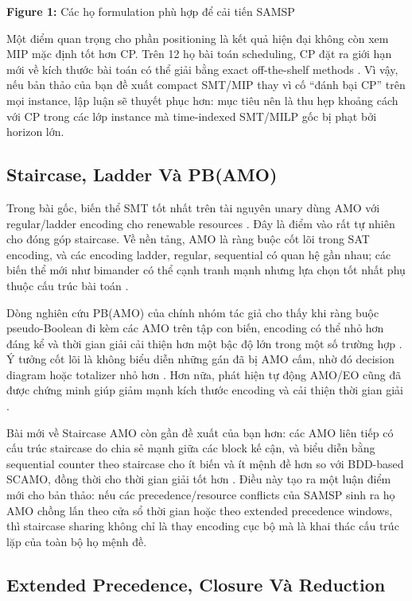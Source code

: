 \textbf{Figure 1:} Các họ formulation phù hợp để cải tiến SAMSP


Một điểm quan trọng cho phần positioning là kết quả hiện đại không còn xem MIP mặc định tốt hơn CP. Trên 12 họ bài toán scheduling, CP đặt ra giới hạn mới về kích thước bài toán có thể giải bằng exact off-the-shelf methods  \cite{Naderi2023Mixed-Integer}. Vì vậy, nếu bản thảo của bạn đề xuất compact SMT/MIP thay vì cố “đánh bại CP” trên mọi instance, lập luận sẽ thuyết phục hơn: mục tiêu nên là thu hẹp khoảng cách với CP trong các lớp instance mà time-indexed SMT/MILP gốc bị phạt bởi horizon lớn.


\subsection*{Staircase, Ladder Và PB(AMO)}


Trong bài gốc, biến thể SMT tốt nhất trên tài nguyên unary dùng AMO với regular/ladder encoding cho renewable resources  \cite{Bofill2022The}. Đây là điểm vào rất tự nhiên cho đóng góp staircase. Về nền tảng, AMO là ràng buộc cốt lõi trong SAT encoding, và các encoding ladder, regular, sequential có quan hệ gần nhau; các biến thể mới như bimander có thể cạnh tranh mạnh nhưng lựa chọn tốt nhất phụ thuộc cấu trúc bài toán  \cite{Hölldobler2013An}.


Dòng nghiên cứu PB(AMO) của chính nhóm tác giả cho thấy khi ràng buộc pseudo-Boolean đi kèm các AMO trên tập con biến, encoding có thể nhỏ hơn đáng kể và thời gian giải cải thiện hơn một bậc độ lớn trong một số trường hợp  \cite{Bofill2021SAT}. Ý tưởng cốt lõi là không biểu diễn những gán đã bị AMO cấm, nhờ đó decision diagram hoặc totalizer nhỏ hơn  \cite{Bofill2020An}. Hơn nữa, phát hiện tự động AMO/EO cũng đã được chứng minh giúp giảm mạnh kích thước encoding và cải thiện thời gian giải  \cite{Ansótegui2019Automatic}.


Bài mới về Staircase AMO còn gần đề xuất của bạn hơn: các AMO liên tiếp có cấu trúc staircase do chia sẻ mạnh giữa các block kế cận, và biểu diễn bằng sequential counter theo staircase cho ít biến và ít mệnh đề hơn so với BDD-based SCAMO, đồng thời cho thời gian giải tốt hơn  \cite{Truong2025Sequential}. Điều này tạo ra một luận điểm mới cho bản thảo: nếu các precedence/resource conflicts của SAMSP sinh ra họ AMO chồng lấn theo cửa sổ thời gian hoặc theo extended precedence windows, thì staircase sharing không chỉ là thay encoding cục bộ mà là khai thác cấu trúc lặp của toàn bộ họ mệnh đề.


\subsection*{Extended Precedence, Closure Và Reduction}



